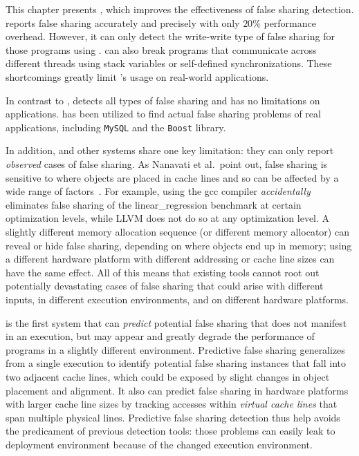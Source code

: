 \label{chapter:preditor}

This chapter presents \Predator{}, which improves the effectiveness of false sharing detection. \SheriffDetect{} reports false sharing accurately and precisely with only $20\%$ performance overhead. However, it can only detect the write-write type of false sharing for those programs using \pthreads{}. \SheriffDetect{} can also break programs that communicate across different threads using stack variables or self-defined synchronizations. These shortcomings greatly limit \SheriffDetect{}'s usage on real-world applications.  

In contrast to \SheriffDetect{}, \Predator{} detects all types of false sharing and has no limitations on applications. \Predator{} has been utilized to find actual false sharing problems of real applications, including \texttt{MySQL} and the \texttt{Boost} library.

In addition, \SheriffDetect{} and other systems share one key limitation: they can only report \emph{observed} cases of false sharing. As Nanavati et al.\ point out, false sharing is sensitive to where objects are placed in cache lines and so can be affected by a wide range of factors~\cite{OSdetection}. For example, using the gcc compiler \emph{accidentally} eliminates false sharing of the linear\_regression benchmark at certain optimization levels, while LLVM does not do so at any optimization level.  A slightly different memory allocation sequence (or different memory allocator) can reveal or hide false sharing, depending on where objects end up in memory; using a different hardware platform with different addressing or cache line sizes can have the same effect. All of this means that existing tools cannot root out potentially devastating cases of false sharing that could arise with different inputs, in different execution environments, and on different hardware platforms.

\Predator{} is the first system that can \emph{predict} potential false sharing that does not manifest in an execution, but may appear and greatly degrade the performance of programs in a slightly different environment. Predictive false sharing generalizes from a single execution to identify potential false sharing instances that fall into two adjacent cache lines, which could be exposed by slight changes in object placement and alignment. It also can predict false sharing in hardware platforms with larger cache line sizes by tracking accesses within \emph{virtual cache lines} that span multiple physical lines. Predictive false sharing detection thus help avoids the predicament of previous detection tools: those problems can easily leak to deployment environment because of the changed execution environment.

